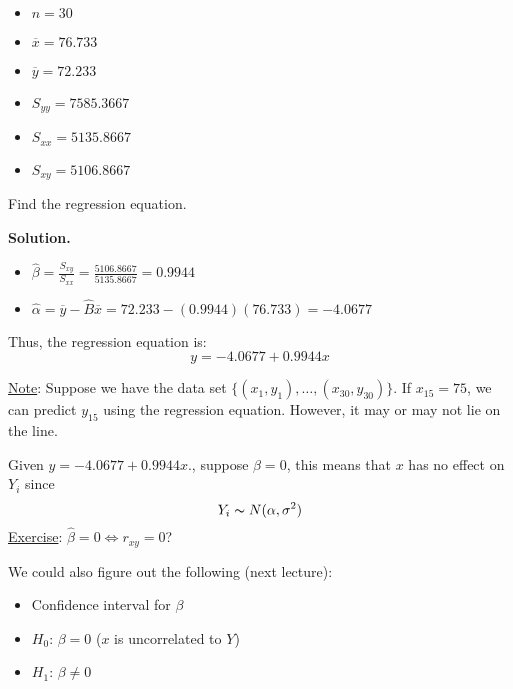 \begin{exbox}
    \begin{example} $ \; $
        \begin{itemize}
            \item $ n=30 $
            \item $ \overline{x}=76.733 $
            \item $ \overline{y}=72.233 $
            \item $ S_{yy}=7585.3667 $
            \item $ S_{xx}=5135.8667 $
            \item $ S_{xy}=5106.8667 $
        \end{itemize}
        Find the regression equation.

        \textbf{Solution.}
        \begin{itemize}
            \item $ \hat{\beta}=\frac{S_{xy}}{S_{xx}}=\frac{5106.8667}{5135.8667}=0.9944 $
            \item $ \hat{\alpha}=\overline{y}-\hat{B}\overline{x}=72.233-(0.9944)(76.733)=-4.0677 $
        \end{itemize}
        Thus, the regression equation is:
        \[ y=-4.0677+0.9944x \]
    \end{example}
\end{exbox}
\underline{Note}: Suppose we have the data set $ \{(x_1,y_1),\ldots ,(x_{30},y_{30})\} $.
If $ x_{15}=75 $, we can predict $ y_{15} $ using the regression equation.
However, it may or may not lie on the line.

Given $ y=-4.0677+0.9944x  $., suppose $ \beta=0 $, this means that $ x $ has no effect on $ Y_i $ since
\[ Y_i \thicksim N(\alpha,\sigma^2) \]
\underline{Exercise}: $ \hat{\beta}=0\iff r_{xy}=0 $?

We could also figure out the following (next lecture):
\begin{itemize}
    \item Confidence interval for $ \beta $
    \item $ H_0 $: $ \beta=0 $ ($ x $ is uncorrelated to $ Y $)
    \item $ H_1 $: $ \beta\neq 0 $
\end{itemize}
